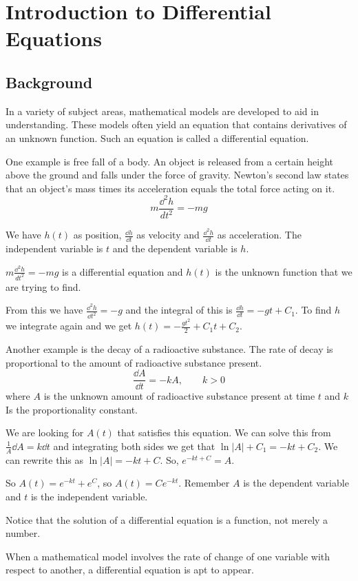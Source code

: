 \documentclass[../diffeq.tex]{subfiles}
\begin{document}
\chapter{Introduction to Differential Equations}
\section{Background}
In a variety of subject areas, mathematical models are developed to aid in understanding. These models often yield an equation that contains derivatives of an unknown function. Such an equation is called a differential equation.

One example is free fall of a body. An object is released from a certain height above the ground and falls under the force of gravity. Newton's second law states that an object's mass times its acceleration equals the total force acting on it.
\[ m\frac{\dd^2 h}{dt^2}=-mg \]

We have $h(t)$ as position, $\frac{\dd h}{\dd t}$ as velocity and $\frac{\dd^2 h}{\dd t}$ as acceleration. The independent variable is $t$ and the dependent variable is $h$.

$m\frac{\dd^2 h}{dt^2}=-mg$ is a differential equation and $h(t)$ is the unknown function that we are trying to find.

From this we have $\frac{\dd^2 h}{\dd t^2} = -g$ and the integral of this is $\frac{\dd h}{\dd t} = -gt + C_1$. To find $h$ we integrate again and we get $h(t) = -\frac{gt^2}{2}+C_1t+C_2$.

Another example is the decay of a radioactive substance. The rate of decay is proportional to the amount of radioactive substance present.
\[ \frac{\dd A}{\dd t} = -kA, \qquad k>0 \]
where $A$ is the unknown amount of radioactive substance present at time $t$ and $k$ Is the proportionality constant.

We are looking for $A(t)$ that satisfies this equation. We can solve this from $\frac{1}{A}\dd A = k\dd t$ and integrating both sides we get that 
$\ln |A| + C_1 = -kt+C_2$. We can rewrite this as $\ln|A| = -kt + C$. So, $e^{-kt+C}=A$.

So $A(t)=e^{-kt}+e^C$, so $A(t)=Ce^{-kt}$. Remember $A$ is the dependent variable and $t$ is the independent variable.

Notice that the solution of a differential equation is a function, not merely a number.

When a mathematical model involves the rate of change of one variable with respect to another, a differential equation is apt to appear.
\end{document}
